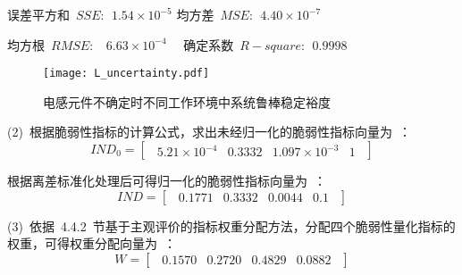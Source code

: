 \qquad 误差平方和~$SSE\colon~~1.54\times10^{-5}$  \qquad 均方差~$MSE\colon~~4.40\times10^{-7} $

\qquad 均方根~$RMSE\colon~~~~6.63\times10^{-4}$    ~~\qquad 确定系数~$R-square\colon~~0.9998$

\iffalse
\begin{table}[htbp]
  \centering
\begin{tabular}{p{5cm}p{5cm}}

  误差平方和~$SSE\colon~~1.54\times10^{-5}$     &~~均方差~$MSE\colon~~4.40\times10^{-7} $\\

  均方根~$RMSE\colon~~6.63\times10^{-4}$        &~~确定系数~$R-square\colon~~0.9998$ \\
\end{tabular}
\end{table}
\fi
\begin{figure}[h]
  \centering
     \texttt{[image: L\_uncertainty.pdf]}\\
     \medskip
  \caption{电感元件不确定时不同工作环境中系统鲁棒稳定裕度}\label{fig:chap5:luncertainty}
\end{figure}

(2)~根据脆弱性指标的计算公式，求出未经归一化的脆弱性指标向量为~：
\begin{equation}\label{equ:chap5:Index35}
IND_0=\left[
\begin{matrix}
~~5.21\times10^{-4} &0.3332  &1.097\times10^{-3}  &1~~
\end{matrix}
\right]
\end{equation}

根据离差标准化处理后可得归一化的脆弱性指标向量为~：
\begin{equation}\label{equ:chap5:Index36}
IND=\left[
\begin{matrix}
~~0.1771 &0.3332  &0.0044  &0.1~~
\end{matrix}
\right]
\end{equation}

(3)~依据~4.4.2~节基于主观评价的指标权重分配方法，分配四个脆弱性量化指标的权重，可得权重分配向量为~：
\begin{equation}\label{equ:chap5:Index37}
W=\left[
\begin{matrix}
~~0.1570 &0.2720  &0.4829  &0.0882~~
\end{matrix}
\right]
\end{equation}

